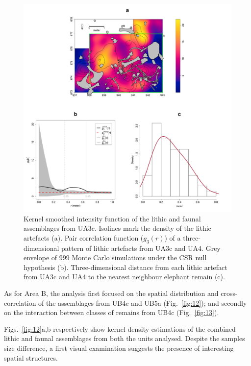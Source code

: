 \documentclass[preprint,authoryear,times]{elsarticle} %
\begin{document}
\begin{figure}[]
  \centering
  \includegraphics[width=1\textwidth]{../artwork/Fig11.pdf}
  \caption{Kernel smoothed intensity function of the lithic and faunal assemblages from UA3c. Isolines mark the density of the lithic artefacts (a). Pair correlation function ($g_3(r)$) of a three-dimensional pattern of lithic artefacts from UA3c and UA4. Grey envelope of 999 Monte Carlo simulations under the CSR null hypothesis (b). Three-dimensional distance from each lithic artefact from UA3c and UA4 to the nearest neighbour elephant remain (c).}
  \label{fig:11}
\end{figure}


As for Area B, the analysis first focused on the spatial distribution and cross-correlation of the assemblages from UB4c and UB5a (Fig.~\ref{fig:12}); and secondly on the interaction between classes of remains from UB4c (Fig.~\ref{fig:13}).

Figs.~\ref{fig:12}a,b respectively show kernel density estimations of the combined lithic and faunal assemblages from both the units analysed. Despite the samples size difference, a first visual examination suggests the presence of interesting spatial structures.
\end{document}
